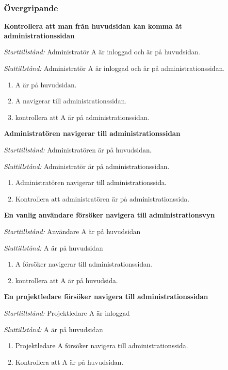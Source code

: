 \documentclass[a4paper]{article}
\begin{document}
\subsubsection{Övergripande}
\begin{FT}
\item %
\textbf{Kontrollera att man från huvudsidan kan komma åt administrationssidan}

\emph{Starttillstånd:}  Administratör A är inloggad och är på huvudsidan.

\emph{Sluttillstånd:} Administratör A är inloggad och är på administrationssidan.

\begin{enumerate}
\item A är på huvudsidan.
\item A navigerar till administrationssidan.
\item kontrollera att A är på administrationssidan. 
\end{enumerate}

\item %
\textbf{Administratören navigerar till administrationssidan}

\emph{Starttillstånd:} Administratören är på huvudsidan.

\emph{Sluttillstånd:} Administratör är på administrationssidan.

\begin{enumerate}
\item Administratören navigerar till administrationssida.
\item Kontrollera att administratören är på administrationssida.
\end{enumerate}

\item %
\textbf{En vanlig användare försöker navigera till administrationsvyn}

\emph{Starttillstånd:} Användare A är på huvudsidan

\emph{Sluttillstånd:} A är på huvudsidan

\begin{enumerate}
\item A försöker navigerar till administrationssidan.
\item kontrollera att A är på huvudsida. 
\end{enumerate}

\item %
\textbf{En projektledare försöker navigera till administrationssidan}

\emph{Starttillstånd:} Projektledare A är inloggad

\emph{Sluttillstånd:} A är på huvudsidan 

\begin{enumerate}
\item Projektledare A försöker navigera till administrationssida.
\item Kontrollera att A är på huvudsidan.

\end{enumerate}
\end{FT}
\end{document}
